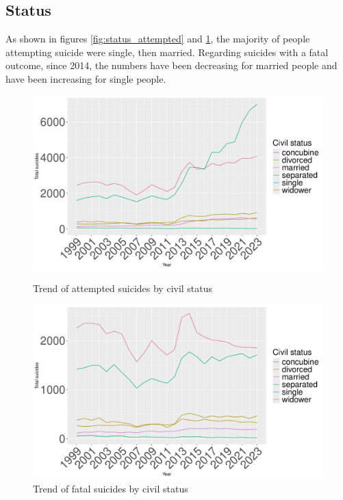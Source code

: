 \documentclass{article}
\begin{document}
\subsection{Status}
As shown in figures \ref{fig:status_attempted} and \ref{fig:status_fatal},
the majority of people attempting suicide were single, then married.
Regarding suicides with a fatal outcome, since 2014, the numbers have been decreasing
for married
people and have been increasing for single people.
\begin{figure}[H]
    \centering
    \begin{minipage}{0.65\textwidth}
        \includegraphics[width=\textwidth]{imgs/status_attempted.pdf}
        \caption{Trend of attempted suicides by civil status }
	\label{fig:status_attempted}
    \end{minipage}
    \hfill
    \begin{minipage}{0.65\textwidth}
        \includegraphics[width=\textwidth]{imgs/status_fatal.pdf}
        \caption{Trend of fatal suicides by civil status }
	\label{fig:status_fatal}
    \end{minipage}
\end{figure}
\end{document}
